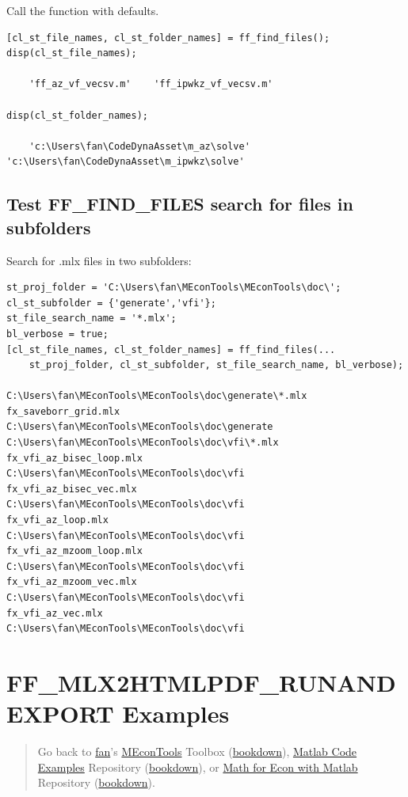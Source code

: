 \documentclass[
]{book}
\begin{document}
Call the function with defaults.

\begin{verbatim}
[cl_st_file_names, cl_st_folder_names] = ff_find_files();
disp(cl_st_file_names);

    'ff_az_vf_vecsv.m'    'ff_ipwkz_vf_vecsv.m'

disp(cl_st_folder_names);

    'c:\Users\fan\CodeDynaAsset\m_az\solve'    'c:\Users\fan\CodeDynaAsset\m_ipwkz\solve'
\end{verbatim}

\hypertarget{test-ff_find_files-search-for-files-in-subfolders}{%
\subsection{Test FF\_FIND\_FILES search for files in subfolders}\label{test-ff_find_files-search-for-files-in-subfolders}}

Search for .mlx files in two subfolders:

\begin{verbatim}
st_proj_folder = 'C:\Users\fan\MEconTools\MEconTools\doc\';
cl_st_subfolder = {'generate','vfi'};
st_file_search_name = '*.mlx';
bl_verbose = true;
[cl_st_file_names, cl_st_folder_names] = ff_find_files(...
    st_proj_folder, cl_st_subfolder, st_file_search_name, bl_verbose);

C:\Users\fan\MEconTools\MEconTools\doc\generate\*.mlx
fx_saveborr_grid.mlx
C:\Users\fan\MEconTools\MEconTools\doc\generate
C:\Users\fan\MEconTools\MEconTools\doc\vfi\*.mlx
fx_vfi_az_bisec_loop.mlx
C:\Users\fan\MEconTools\MEconTools\doc\vfi
fx_vfi_az_bisec_vec.mlx
C:\Users\fan\MEconTools\MEconTools\doc\vfi
fx_vfi_az_loop.mlx
C:\Users\fan\MEconTools\MEconTools\doc\vfi
fx_vfi_az_mzoom_loop.mlx
C:\Users\fan\MEconTools\MEconTools\doc\vfi
fx_vfi_az_mzoom_vec.mlx
C:\Users\fan\MEconTools\MEconTools\doc\vfi
fx_vfi_az_vec.mlx
C:\Users\fan\MEconTools\MEconTools\doc\vfi
\end{verbatim}

\hypertarget{ff_mlx2htmlpdf_runandexport-examples}{%
\section{FF\_MLX2HTMLPDF\_RUNANDEXPORT Examples}\label{ff_mlx2htmlpdf_runandexport-examples}}

\begin{quote}
Go back to \href{http://fanwangecon.github.io/}{fan}'s \href{https://fanwangecon.github.io/MEconTools/}{MEconTools} Toolbox (\href{https://fanwangecon.github.io/MEconTools/bookdown}{bookdown}), \href{https://fanwangecon.github.io/M4Econ/}{Matlab Code Examples} Repository (\href{https://fanwangecon.github.io/M4Econ/bookdown}{bookdown}), or \href{https://fanwangecon.github.io/Math4Econ/}{Math for Econ with Matlab} Repository (\href{https://fanwangecon.github.io/Math4Econ/bookdown}{bookdown}).
\end{quote}
\end{document}
